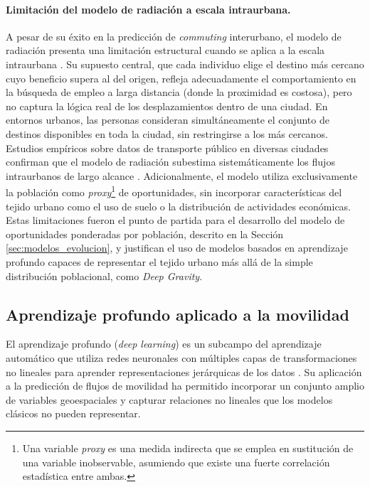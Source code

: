 \paragraph{Limitación del modelo de radiación a escala intraurbana.} A pesar de su éxito en la predicción de \textit{commuting} interurbano, el modelo de radiación presenta una limitación estructural cuando se aplica a la escala intraurbana \cite{yan2014population, liu2020intervening}. Su supuesto central, que cada individuo elige el destino más cercano cuyo beneficio supera al del origen, refleja adecuadamente el comportamiento en la búsqueda de empleo a larga distancia (donde la proximidad es costosa), pero no captura la lógica real de los desplazamientos dentro de una ciudad. En entornos urbanos, las personas consideran simultáneamente el conjunto de destinos disponibles en toda la ciudad, sin restringirse a los más cercanos. Estudios empíricos sobre datos de transporte público en diversas ciudades confirman que el modelo de radiación subestima sistemáticamente los flujos intraurbanos de largo alcance \cite{yan2014population}. Adicionalmente, el modelo utiliza exclusivamente la población como \textit{proxy}\footnote{Una variable \textit{proxy} es una medida indirecta que se emplea en sustitución de una variable inobservable, asumiendo que existe una fuerte correlación estadística entre ambas.} de oportunidades, sin incorporar características del tejido urbano como el uso de suelo o la distribución de actividades económicas. Estas limitaciones fueron el punto de partida para el desarrollo del modelo de oportunidades ponderadas por población, descrito en la Sección \ref{sec:modelos_evolucion}, y justifican el uso de modelos basados en aprendizaje profundo capaces de representar el tejido urbano más allá de la simple distribución poblacional, como \textit{Deep Gravity}.

\subsection{Aprendizaje profundo aplicado a la movilidad}

El aprendizaje profundo (\textit{deep learning}) es un subcampo del aprendizaje automático que utiliza redes neuronales con múltiples capas de transformaciones no lineales para aprender representaciones jerárquicas de los datos \cite{liu2024interdisciplinary}. Su aplicación a la predicción de flujos de movilidad ha permitido incorporar un conjunto amplio de variables geoespaciales y capturar relaciones no lineales que los modelos clásicos no pueden representar.

